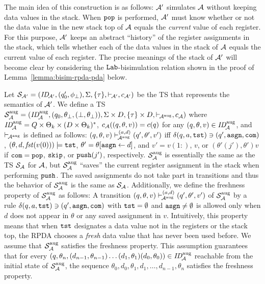 The main idea of this construction is as follows:
${\cal A}'$ simulates ${\cal A}$ without keeping data values in
the stack.
When $\mathtt{pop}$ is performed,
${\cal A}'$ must know whether or not
the data value in the new stack top of ${\cal A}$
equals the \emph{current} value of each register.
For this purpose,
${\cal A}'$ keeps an abstract ``history'' of
the register assignments in the stack,
which tells whether
each of the data values in the stack of ${\cal A}$ equals
the current value of each register.
The precise meanings of the stack of ${\cal A}'$
will become clear
by considering the $\mathtt{Lab}$-bisimulation relation
shown in the proof of Lemma~\ref{lemma:bisim-rpda-pda} below.

Let %
${\cal S}_{{\cal A}'}=(\mathit{ID}_{\!{\cal A}'},(q'_0,\phi_{\bot}),\allowbreak
\Sigma,\{\tau\},{\vdash_{\!{\cal A}'}},c_{{\cal A}'})$ be the TS
that represents the semantics of ${\cal A}'$.
We define a TS
${\cal S}_{{\cal A}}^{\mathrm{aug}}=
(\mathit{ID}_{\!{\cal A}}^{\mathrm{aug}},(q_0,\theta_{\bot},(\bot,\theta_{\bot})),
\Sigma\times D,\{\tau\}\times D,{\vdash_{\!{\cal A}^{\mathrm{aug}}}},c_{{\cal A}})$
where
$\mathit{ID}_{\!{\cal A}}^{\mathrm{aug}}=Q\times\Theta_k\times(D\times\Theta_k)^*$,
$c_{{\cal A}}((q,\theta,v))=c(q)$ for
any $(q,\theta,v)\in\mathit{ID}_{\!{\cal A}}^{\mathrm{aug}}$,
and $\vdash_{\!{\cal A}^{\mathrm{aug}}}$ is defined as follows:
$(q,\theta,v)\vdash_{\!{\cal A}^{\mathrm{aug}}}^{(a,d)}(q',\theta',v')$
iff
$\delta(q,a,\mathtt{tst})\ni (q',\mathtt{asgn},\mathtt{com})$,
$(\theta,d,\mathit{fst}(v(0)))\models\mathtt{tst}$,
$\theta'=\theta[\mathtt{asgn}\gets d]$, and
$v'= v(1{:})$, $v$, or $(\theta'(j'),\theta')v$
if $\mathtt{com}=\mathtt{pop}$, $\mathtt{skip}$, or $\mathtt{push}(j')$, respectively.
${\cal S}_{{\cal A}}^{\mathrm{aug}}$ is essentially
the same as the TS ${\cal S}_{{\cal A}}$ for ${\cal A}$,
but ${\cal S}_{{\cal A}}^{\mathrm{aug}}$
``saves'' the current register assignment in the stack
when performing $\mathtt{push}$.
The saved assignments do not take part in transitions and thus
the behavior of
${\cal S}_{{\cal A}}^{\mathrm{aug}}$ is the same as ${\cal S}_{{\cal A}}$.
Additionally,
we define the freshness property of ${\cal S}_{{\cal A}}^{\mathrm{aug}}$
as follows:
A transition
$(q,\theta,v)\vdash_{\!{\cal A}^{\mathrm{aug}}}^{(a,d)}(q',\theta',v')$
of ${\cal S}_{{\cal A}}^{\mathrm{aug}}$
by a rule
$\delta(q,a,\mathtt{tst})\ni (q',\mathtt{asgn},\mathtt{com})$ with $\mathtt{tst}=\emptyset$ and
$\mathtt{asgn}\ne\emptyset$ is allowed
only when $d$ does not appear in $\theta$ or any saved assignment in $v$.
Intuitively,
this property means that when $\mathtt{tst}$ designates a data value not in
the registers or the stack top,
the RPDA chooses a \emph{fresh} data value that has never been used before.
We assume that ${\cal S}_{{\cal A}}^{\mathrm{aug}}$ satisfies the freshness property.
This assumption guarantees that
for every
$(q,\theta_n,(d_{n-1},\theta_{n-1})\ldots(d_1,\theta_1)(d_0,\theta_0))
\in\mathit{ID}_{\!{\cal A}}^{\mathrm{aug}}$ reachable from the initial state of
${\cal S}_{{\cal A}}^{\mathrm{aug}}$,
the sequence
$\theta_0,d_0,\theta_1,d_1,\ldots,d_{n-1},\theta_n$ satisfies
the freshness property.


